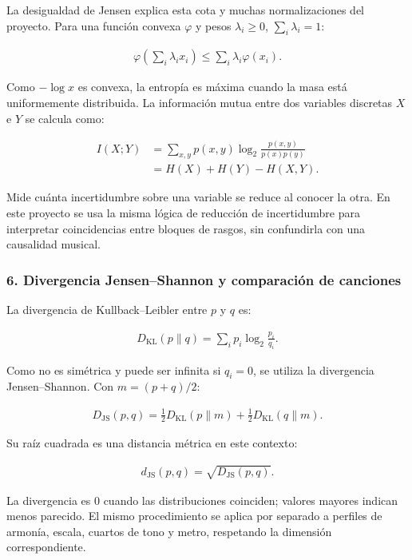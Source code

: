 \documentclass[11pt, a4paper]{article}
\begin{document}
La desigualdad de Jensen explica esta cota y muchas normalizaciones del proyecto. Para una función convexa $\varphi$ y pesos $\lambda_i\geq0$, $\sum_i\lambda_i=1$:

\begin{align}
\varphi\left(\sum_i\lambda_i x_i\right)\leq\sum_i\lambda_i\varphi(x_i).
\end{align}

Como $-\log x$ es convexa, la entropía es máxima cuando la masa está uniformemente distribuida. La información mutua entre dos variables discretas $X$ e $Y$ se calcula como:

\begin{align}
I(X;Y)&=\sum_{x,y}p(x,y)\log_2\frac{p(x,y)}{p(x)p(y)}\\
&=H(X)+H(Y)-H(X,Y).
\end{align}

Mide cuánta incertidumbre sobre una variable se reduce al conocer la otra. En este proyecto se usa la misma lógica de reducción de incertidumbre para interpretar coincidencias entre bloques de rasgos, sin confundirla con una causalidad musical.

\subsubsection*{6. Divergencia Jensen--Shannon y comparación de canciones}

La divergencia de Kullback--Leibler entre $p$ y $q$ es:

\begin{align}
D_{\mathrm{KL}}(p\|q)=\sum_i p_i\log_2\frac{p_i}{q_i}.
\end{align}

Como no es simétrica y puede ser infinita si $q_i=0$, se utiliza la divergencia Jensen--Shannon. Con $m=(p+q)/2$:

\begin{align}
D_{\mathrm{JS}}(p,q)=\frac12D_{\mathrm{KL}}(p\|m)+\frac12D_{\mathrm{KL}}(q\|m).
\end{align}

Su raíz cuadrada es una distancia métrica en este contexto:

\begin{align}
d_{\mathrm{JS}}(p,q)=\sqrt{D_{\mathrm{JS}}(p,q)}.
\end{align}

La divergencia es $0$ cuando las distribuciones coinciden; valores mayores indican menos parecido. El mismo procedimiento se aplica por separado a perfiles de armonía, escala, cuartos de tono y metro, respetando la dimensión correspondiente.
\end{document}
